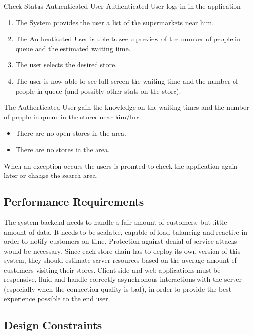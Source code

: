 \usecase
{Check Status}
{Authenticated User}
{Authenticated User logs-in in the application}
{
        \begin{enumerate}
            \item The System provides the user a list of the supermarkets near him.
            \item The Authenticated User is able to see a preview of the number of people in queue and the estimated waiting time. 
            \item The user selects the desired store. 
            \item The user is now able to see full screen the waiting time and the number of people in queue (and possibly other stats on the store).  
        \end{enumerate}
}
{
    The Authenticated User gain the knowledge on the waiting times and the number of people in queue in the stores near him/her. 
}
{
    \begin{itemize}
        \item There are no open stores in the area. 
        \item There are no stores in the area. 
    \end{itemize}
}
{
    When an exception occurs the users is promted to check the application again later or change the search area. 
}




\subsection{Performance Requirements}
The system backend needs to handle a fair amount of customers, but little amount of data. It needs to be scalable, capable of load-balancing and reactive in order to notify customers on time. Protection against denial of service attacks would be necessary.
Since each store chain has to deploy its own version of this system, they should estimate server resources based on the average amount of customers visiting their stores.
Client-side and web applications must be responsive, fluid and handle correctly asynchronous interactions with the server (especially when the connection quality is bad), in order to provide the best experience possible to the end user.

\subsection{Design Constraints}
